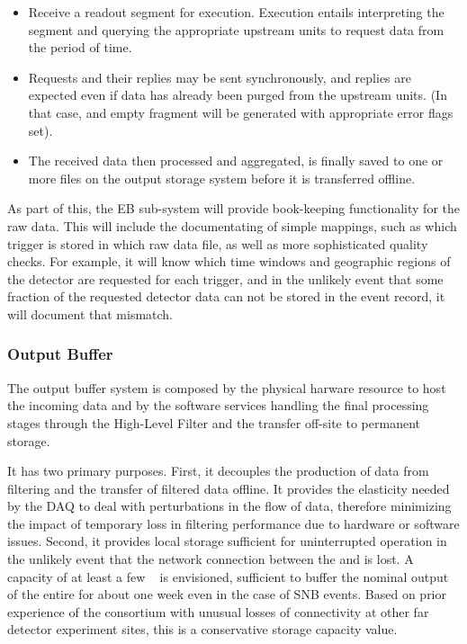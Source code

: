 \begin{itemize}
  \item Receive a readout segment for execution. Execution entails interpreting the  segment and querying the appropriate upstream  units to request data from the period of time. 
  \item Requests and their replies may be sent synchronously, and replies are expected even if data has already been purged from the upstream  units. (In that case, and empty fragment will be generated with appropriate error flags set).
  \item The received data then processed and aggregated, is finally saved to one or more files on the output storage system before it is transferred offline.
\end{itemize}


As part of this, the EB sub-system will provide book-keeping functionality for the raw data.  This will include the documentating of simple mappings, such as which trigger is stored in which raw data file, as well as more sophisticated quality checks. For example, it will know which time windows and geographic regions of the detector are requested for each trigger, and in the unlikely event that some fraction of the requested detector data can not be stored in the event record, it will document that mismatch.

\subsubsection{Output Buffer}

The output buffer system is composed by the physical harware resource to host the incoming data and by the software services handling the final processing stages through the High-Level Filter and the transfer off-site to permanent storage.

It has two primary purposes.  First, it decouples the production of data from filtering and the
transfer of filtered data offline. It provides the elasticity needed by the DAQ to deal with
perturbations in the flow of data, therefore minimizing the impact of temporary loss in filtering
performance due to hardware or software issues. Second, it provides local storage sufficient for
uninterrupted  operation in the unlikely event that the network connection between the
 and \fnal is lost.  A capacity of at least a few \si{\peta\byte} is envisioned,
sufficient to buffer the nominal output of the entire  for about one week even in the case of SNB events. Based on prior experience of the consortium with unusual losses of  connectivity at
other far detector experiment sites, this is a conservative storage capacity value.

